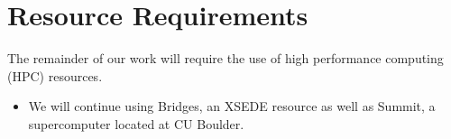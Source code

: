 \documentclass{article}
\begin{document}
  \section{Resource Requirements}\label{section:resources}
  
  The remainder of our work will require the use of high performance computing (HPC)
  resources. 
  \begin{itemize}
    \item We will continue using Bridges, an XSEDE resource as well as Summit, a
    supercomputer located at CU Boulder.
  \end{itemize}
  

  \newpage
  
  
\end{document}
